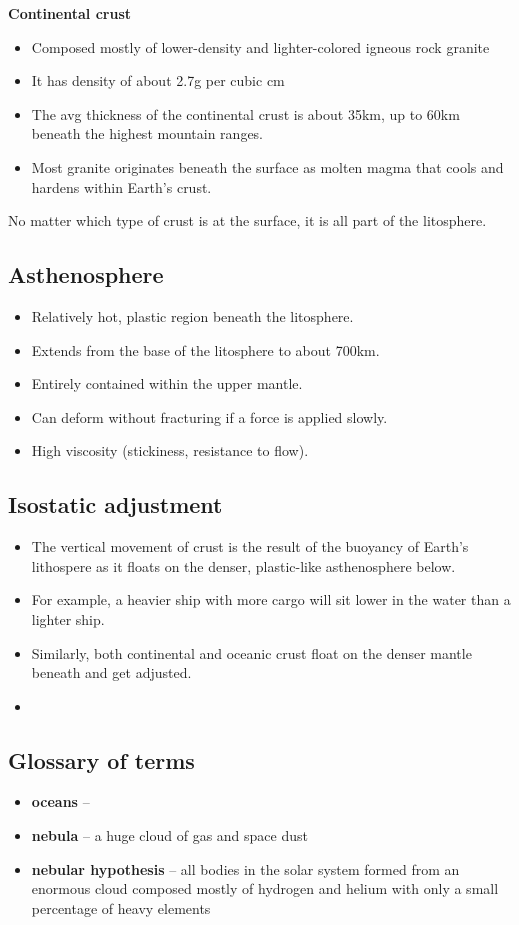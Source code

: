 \textbf{Continental crust}
\begin{itemize}
	\item Composed mostly of lower-density and lighter-colored igneous
		rock granite
	\item It has density of about 2.7g per cubic cm
	\item The avg thickness of the continental crust is about 35km, up to
		60km beneath the highest mountain ranges.
	\item Most granite originates beneath the surface as molten magma that
		cools and hardens within Earth's crust.
\end{itemize}

No matter which type of crust is at the surface, it is all part of the
litosphere.

\subsection{Asthenosphere}

\begin{itemize}
	\item Relatively hot, plastic region beneath the litosphere.
	\item Extends from the base of the litosphere to about 700km.
	\item Entirely contained within the upper mantle.
	\item Can deform without fracturing if a force is applied slowly.
	\item High viscosity (stickiness, resistance to flow).
\end{itemize}

\subsection{Isostatic adjustment}

\begin{itemize}
	\item The vertical movement of crust is the result of the buoyancy of
		Earth's lithospere as it floats on the denser, plastic-like
		asthenosphere below.
	\item For example, a heavier ship  with more cargo will sit lower in
		the water than a lighter ship.
	\item Similarly, both continental and oceanic crust float on the denser
		mantle beneath and get adjusted.
	\item
\end{itemize}

\subsection{Glossary of terms}

\begin{itemize}
	\item \textbf{oceans} -- 
	\item \textbf{nebula} -- a huge cloud of gas and space dust
	\item \textbf{nebular hypothesis} -- all bodies in the solar system
		formed from an enormous cloud composed mostly of hydrogen and
		helium with only a small percentage of heavy elements
\end{itemize}
